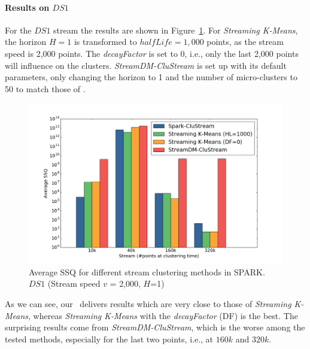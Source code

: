 \paragraph{Results on $DS1$}
For the $DS1$ stream the results are shown in Figure~\ref{fig:comparison2000}. %
For \textit{Streaming K-Means}, the horizon $H=1$ is transformed to $halfLife=1,000$ points, as the stream speed is 2,000 points. %
The \textit{decayFactor} is set to 0, i.e., only the last 2,000 points will influence on the clusters. %
\textit{StreamDM-CluStream} is set up with its default parameters, only changing the horizon to 1 and the number of micro-clusters to 50 to match those of \our.
%
\begin{figure}[h]
 \centering
 \includegraphics[scale=0.265]{./styles/comparison2000.png}
 \caption{Average SSQ for different stream clustering methods in SPARK. $DS1$ (Stream speed $v$ = 2,000, $H$=1)}
 \label{fig:comparison2000}
\end{figure}
%
As we can see, our \our~delivers results which are very close to those of \textit{Streaming K-Means}, whereas \textit{Streaming K-Means} with the \textit{decayFactor} (DF) is the best.
The surprising results come from \textit{StreamDM-CluStream}, which is the worse among the tested methods, especially for the last two points, i.e., at $160k$ and $320k$.
